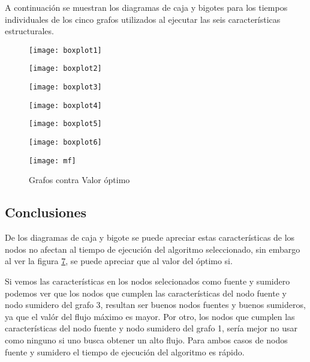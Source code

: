 \documentclass[a4paper, 11pt]{article}
\begin{document}
A continuación se muestran los diagramas de caja y bigotes para los tiempos individuales de los cinco grafos utilizados al ejecutar las seis características estructurales.

\begin{figure}[H]
\centering
\texttt{[image: boxplot1]}
\label{figure7}
\end{figure}

\begin{figure}[H]
\centering
\texttt{[image: boxplot2]}
\label{figure7}
\end{figure}

\begin{figure}[H]
\centering
\texttt{[image: boxplot3]}
\label{figure7}
\end{figure}

\begin{figure}[H]
\centering
\texttt{[image: boxplot4]}
\label{figure7}
\end{figure}

\begin{figure}[H]
\centering
\texttt{[image: boxplot5]}
\label{figure7}
\end{figure}

\begin{figure}[H]
\centering
\texttt{[image: boxplot6]}
\label{figure7}
\end{figure}


\begin{figure}[H]
\centering
\texttt{[image: mf]}
\caption{Grafos contra Valor óptimo} 
\label{figure8}
\end{figure}


\subsection*{Conclusiones}
De los diagramas de caja y bigote se puede apreciar estas características de los nodos no afectan al tiempo de ejecución del algoritmo seleccionado, sin embargo al ver la figura \ref{figure8}, se puede apreciar que al valor del óptimo si.

Si vemos las características en los nodos selecionados como fuente y sumidero podemos ver que los nodos que cumplen las características del nodo fuente y nodo sumidero del grafo 3, resultan ser buenos nodos fuentes y buenos sumideros, ya que el valór del flujo máximo es mayor. Por otro, los nodos que cumplen las características del nodo fuente y nodo sumidero del grafo 1, sería mejor no usar como ninguno si uno busca obtener un alto flujo. Para ambos casos de nodos fuente y sumidero el tiempo de ejecución del algoritmo es rápido. 




\nocite{*}
\end{document}

